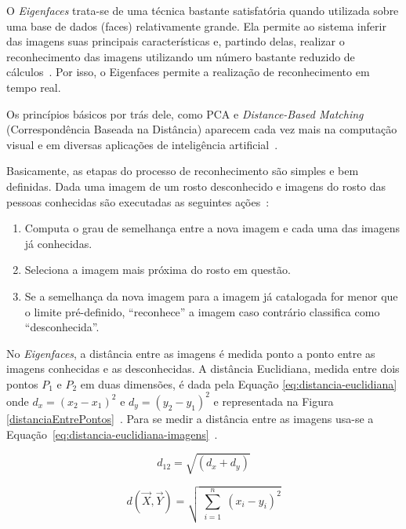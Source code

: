 	O \textit{Eigenfaces} trata-se de uma técnica bastante satisfatória quando utilizada
	sobre uma base de dados (faces) relativamente grande. Ela permite ao sistema
	inferir das imagens suas principais características e, partindo delas, realizar
	o reconhecimento das imagens utilizando um número bastante reduzido de
	cálculos~\cite{artigo-eigenface}. Por isso, o Eigenfaces permite a realização
	de reconhecimento em tempo real.
	
	Os princípios básicos por trás dele, como PCA e \textit{Distance-Based
	Matching} (Correspondência Baseada na Distância) aparecem cada vez mais na computação
	visual e em diversas aplicações de inteligência artificial~\cite{hewitt}.
	
	Basicamente, as etapas do processo de reconhecimento são simples e bem
	definidas. Dada uma imagem de um rosto desconhecido e imagens do rosto das
	pessoas conhecidas são executadas as seguintes ações~\cite{hewitt}:

	\begin{enumerate}
		\item Computa o grau de semelhança entre a nova imagem e cada uma das imagens
		já conhecidas.
		\item Seleciona a imagem mais próxima do rosto em questão.
		\item Se a semelhança da nova imagem para a imagem já catalogada for menor que
		o limite pré-definido, ``reconhece'' a imagem caso contrário classifica como ``desconhecida''.
	\end{enumerate}

	No \textit{Eigenfaces}, a distância entre as imagens é medida ponto a ponto
	entre as imagens conhecidas e as desconhecidas. A distância Euclidiana, medida
	entre dois pontos $P_1$ e $P_2$ em duas dimensões, é dada pela Equação
	\ref{eq:distancia-euclidiana} onde $\displaystyle d_x = (x_2
	- x_1)^2$ e $\displaystyle d_y = (y_2-y_1)^2$ e representada na Figura
	\ref{distanciaEntrePontos}~\cite{hewitt}. Para se medir a distância entre as
	imagens usa-se a
	Equação~\ref{eq:distancia-euclidiana-imagens}~\cite{perlibakas}.

	\begin{equation}
		\label{eq:distancia-euclidiana}
		d_{12} = \sqrt{(d_{x} + d_{y})}
	\end{equation}

	\begin{equation}
		\label{eq:distancia-euclidiana-imagens}
		d(\vec{X}, \vec{Y}) = \sqrt{\sum_{\substack{i=1}}^{n} (x_i-y_i)^2}
	\end{equation}

